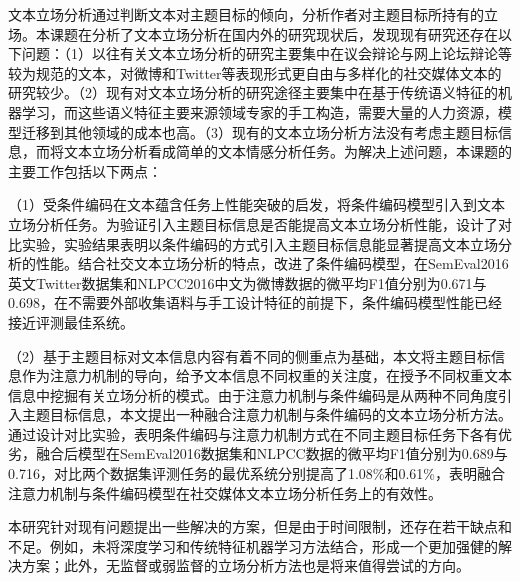 

文本立场分析通过判断文本对主题目标的倾向，分析作者对主题目标所持有的立场。本课题在分析了文本立场分析在国内外的研究现状后，发现现有研究还存在以下问题：（1）以往有关文本立场分析的研究主要集中在议会辩论与网上论坛辩论等较为规范的文本，对微博和Twitter等表现形式更自由与多样化的社交媒体文本的研究较少。（2）现有对文本立场分析的研究途径主要集中在基于传统语义特征的机器学习，而这些语义特征主要来源领域专家的手工构造，需要大量的人力资源，模型迁移到其他领域的成本也高。（3）现有的文本立场分析方法没有考虑主题目标信息，而将文本立场分析看成简单的文本情感分析任务。为解决上述问题，本课题的主要工作包括以下两点：

（1）受条件编码在文本蕴含任务上性能突破的启发，将条件编码模型引入到文本立场分析任务。为验证引入主题目标信息是否能提高文本立场分析性能，设计了对比实验，实验结果表明以条件编码的方式引入主题目标信息能显著提高文本立场分析的性能。结合社交文本立场分析的特点，改进了条件编码模型，在SemEval2016英文Twitter数据集和NLPCC2016中文为微博数据的微平均F1值分别为0.671与0.698，在不需要外部收集语料与手工设计特征的前提下，条件编码模型性能已经接近评测最佳系统。

（2）基于主题目标对文本信息内容有着不同的侧重点为基础，本文将主题目标信息作为注意力机制的导向，给予文本信息不同权重的关注度，在授予不同权重文本信息中挖掘有关立场分析的模式。由于注意力机制与条件编码是从两种不同角度引入主题目标信息，本文提出一种融合注意力机制与条件编码的文本立场分析方法。通过设计对比实验，表明条件编码与注意力机制方式在不同主题目标任务下各有优劣，融合后模型在SemEval2016数据集和NLPCC数据的微平均F1值分别为0.689与0.716，对比两个数据集评测任务的最优系统分别提高了1.08\%和0.61\%，表明融合注意力机制与条件编码模型在社交媒体文本立场分析任务上的有效性。

本研究针对现有问题提出一些解决的方案，但是由于时间限制，还存在若干缺点和不足。例如，未将深度学习和传统特征机器学习方法结合，形成一个更加强健的解决方案；此外，无监督或弱监督的立场分析方法也是将来值得尝试的方向。